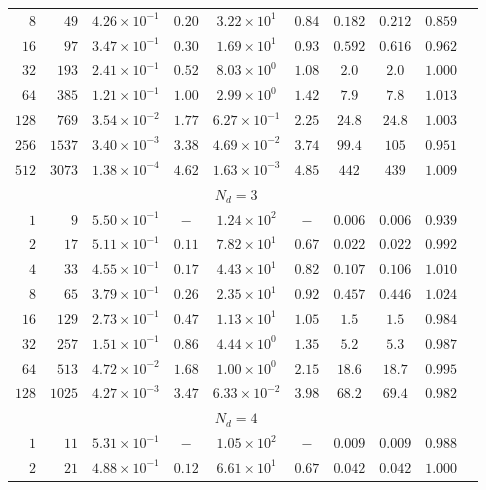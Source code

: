 \begin{table}[htbp]
\begin{tabular}{rr ccc cc cc c}
$8$ & $49$ & $4.26\times 10^{-1}$ & $0.20$ & $3.22\times 10^{1}$ & $0.84$ & $0.182$ & $0.212$ & $0.859$ \\
$16$ & $97$ & $3.47\times 10^{-1}$ & $0.30$ & $1.69\times 10^{1}$ & $0.93$ & $0.592$ & $0.616$ & $0.962$ \\
$32$ & $193$ & $2.41\times 10^{-1}$ & $0.52$ & $8.03\times 10^{0}$ & $1.08$ & $2.0$ & $2.0$ & $1.000$ \\
$64$ & $385$ & $1.21\times 10^{-1}$ & $1.00$ & $2.99\times 10^{0}$ & $1.42$ & $7.9$ & $7.8$ & $1.013$ \\
$128$ & $769$ & $3.54\times 10^{-2}$ & $1.77$ & $6.27\times 10^{-1}$ & $2.25$ & $24.8$ & $24.8$ & $1.003$ \\
$256$ & $1537$ & $3.40\times 10^{-3}$ & $3.38$ & $4.69\times 10^{-2}$ & $3.74$ & $99.4$ & $105$ & $0.951$ \\
$512$ & $3073$ & $1.38\times 10^{-4}$ & $4.62$ & $1.63\times 10^{-3}$ & $4.85$ & $442$ & $439$ & $1.009$ \\
\midrule
\multicolumn{9}{c}{\textbf{$N_d = 3$}} \\
\midrule
$1$ & $9$ & $5.50\times 10^{-1}$ & $-$ & $1.24\times 10^{2}$ & $-$ & $0.006$ & $0.006$ & $0.939$ \\
$2$ & $17$ & $5.11\times 10^{-1}$ & $0.11$ & $7.82\times 10^{1}$ & $0.67$ & $0.022$ & $0.022$ & $0.992$ \\
$4$ & $33$ & $4.55\times 10^{-1}$ & $0.17$ & $4.43\times 10^{1}$ & $0.82$ & $0.107$ & $0.106$ & $1.010$ \\
$8$ & $65$ & $3.79\times 10^{-1}$ & $0.26$ & $2.35\times 10^{1}$ & $0.92$ & $0.457$ & $0.446$ & $1.024$ \\
$16$ & $129$ & $2.73\times 10^{-1}$ & $0.47$ & $1.13\times 10^{1}$ & $1.05$ & $1.5$ & $1.5$ & $0.984$ \\
$32$ & $257$ & $1.51\times 10^{-1}$ & $0.86$ & $4.44\times 10^{0}$ & $1.35$ & $5.2$ & $5.3$ & $0.987$ \\
$64$ & $513$ & $4.72\times 10^{-2}$ & $1.68$ & $1.00\times 10^{0}$ & $2.15$ & $18.6$ & $18.7$ & $0.995$ \\
$128$ & $1025$ & $4.27\times 10^{-3}$ & $3.47$ & $6.33\times 10^{-2}$ & $3.98$ & $68.2$ & $69.4$ & $0.982$ \\
\midrule
\multicolumn{9}{c}{\textbf{$N_d = 4$}} \\
\midrule
$1$ & $11$ & $5.31\times 10^{-1}$ & $-$ & $1.05\times 10^{2}$ & $-$ & $0.009$ & $0.009$ & $0.988$ \\
$2$ & $21$ & $4.88\times 10^{-1}$ & $0.12$ & $6.61\times 10^{1}$ & $0.67$ & $0.042$ & $0.042$ & $1.000$ \\

\end{tabular}
\end{table}
